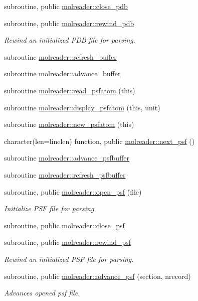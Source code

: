 \begin{DoxyCompactItemize}
subroutine, public \hyperlink{namespacemolreader_a5aafbdb9b4afbb96bdc20ae58d547699}{molreader\+::close\+\_\+pdb}
\item 
subroutine, public \hyperlink{namespacemolreader_af85c66302e278af03e0cc94dc42e662e}{molreader\+::rewind\+\_\+pdb}
\begin{DoxyCompactList}\small\item\em Rewind an initialized P\+DB file for parsing. \end{DoxyCompactList}\item 
subroutine \hyperlink{namespacemolreader_a16d4776fded57cf8aa38f639610cad84}{molreader\+::refresh\+\_\+buffer}
\item 
subroutine \hyperlink{namespacemolreader_ac7b950f165e89b12ccc8fff1c0f3bae9}{molreader\+::advance\+\_\+buffer}
\item 
subroutine \hyperlink{namespacemolreader_a81fcc5a3f49380ccd10b02b229f5067d}{molreader\+::read\+\_\+psfatom} (this)
\item 
subroutine \hyperlink{namespacemolreader_a737dbe023a6cbecab8269981ffdfa31c}{molreader\+::display\+\_\+psfatom} (this, unit)
\item 
subroutine \hyperlink{namespacemolreader_a56968311293e3c68022fe3bbe3600306}{molreader\+::new\+\_\+psfatom} (this)
\item 
character(len=linelen) function, public \hyperlink{namespacemolreader_ac6b85a406b7ebd0810f0d63beeeda783}{molreader\+::next\+\_\+psf} ()
\item 
subroutine \hyperlink{namespacemolreader_abf243c87d2f9429f3ed94293d438c7c7}{molreader\+::advance\+\_\+psfbuffer}
\item 
subroutine \hyperlink{namespacemolreader_a13131c46b34d0385ba7eadd0b1b88df9}{molreader\+::refresh\+\_\+psfbuffer}
\item 
subroutine, public \hyperlink{namespacemolreader_a3ebd81391f00e3279bf262b2879af97a}{molreader\+::open\+\_\+psf} (file)
\begin{DoxyCompactList}\small\item\em Initialize P\+SF file for parsing. \end{DoxyCompactList}\item 
subroutine, public \hyperlink{namespacemolreader_aac446b95d6c274d93e11e45286e60e4d}{molreader\+::close\+\_\+psf}
\item 
subroutine, public \hyperlink{namespacemolreader_a6d79c8d97fd91cfb25dec2b67320c77b}{molreader\+::rewind\+\_\+psf}
\begin{DoxyCompactList}\small\item\em Rewind an initialized P\+SF file for parsing. \end{DoxyCompactList}\item 
subroutine, public \hyperlink{namespacemolreader_a7a4cb6436916cd4b8ee0341d528e9c73}{molreader\+::advance\+\_\+psf} (section, nrecord)
\begin{DoxyCompactList}\small\item\em Advances opened psf file. \end{DoxyCompactList}\end{DoxyCompactItemize}
